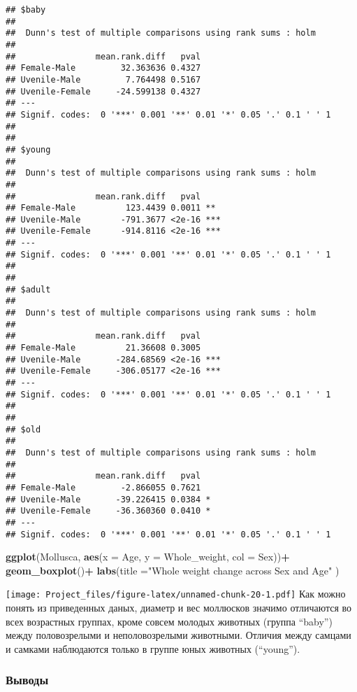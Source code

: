 \documentclass[]{article}
\newenvironment{Shaded}{\begin{snugshade}}{\end{snugshade}}
\newcommand{\DataTypeTok}[1]{\textcolor[rgb]{0.13,0.29,0.53}{#1}}
\newcommand{\KeywordTok}[1]{\textcolor[rgb]{0.13,0.29,0.53}{\textbf{#1}}}
\newcommand{\NormalTok}[1]{#1}
\newcommand{\OperatorTok}[1]{\textcolor[rgb]{0.81,0.36,0.00}{\textbf{#1}}}
\newcommand{\StringTok}[1]{\textcolor[rgb]{0.31,0.60,0.02}{#1}}
\begin{document}
\begin{verbatim}
## $baby
## 
##  Dunn's test of multiple comparisons using rank sums : holm  
## 
##                mean.rank.diff   pval    
## Female-Male         32.363636 0.4327    
## Uvenile-Male         7.764498 0.5167    
## Uvenile-Female     -24.599138 0.4327    
## ---
## Signif. codes:  0 '***' 0.001 '**' 0.01 '*' 0.05 '.' 0.1 ' ' 1
## 
## 
## $young
## 
##  Dunn's test of multiple comparisons using rank sums : holm  
## 
##                mean.rank.diff   pval    
## Female-Male          123.4439 0.0011 ** 
## Uvenile-Male        -791.3677 <2e-16 ***
## Uvenile-Female      -914.8116 <2e-16 ***
## ---
## Signif. codes:  0 '***' 0.001 '**' 0.01 '*' 0.05 '.' 0.1 ' ' 1
## 
## 
## $adult
## 
##  Dunn's test of multiple comparisons using rank sums : holm  
## 
##                mean.rank.diff   pval    
## Female-Male          21.36608 0.3005    
## Uvenile-Male       -284.68569 <2e-16 ***
## Uvenile-Female     -306.05177 <2e-16 ***
## ---
## Signif. codes:  0 '***' 0.001 '**' 0.01 '*' 0.05 '.' 0.1 ' ' 1
## 
## 
## $old
## 
##  Dunn's test of multiple comparisons using rank sums : holm  
## 
##                mean.rank.diff   pval    
## Female-Male         -2.866055 0.7621    
## Uvenile-Male       -39.226415 0.0384 *  
## Uvenile-Female     -36.360360 0.0410 *  
## ---
## Signif. codes:  0 '***' 0.001 '**' 0.01 '*' 0.05 '.' 0.1 ' ' 1
\end{verbatim}

\begin{Shaded}
\begin{Highlighting}[]
\KeywordTok{ggplot}\NormalTok{(Mollusca, }\KeywordTok{aes}\NormalTok{(}\DataTypeTok{x =}\NormalTok{ Age, }\DataTypeTok{y =}\NormalTok{ Whole_weight, }\DataTypeTok{col =}\NormalTok{ Sex))}\OperatorTok{+}
\StringTok{   }\KeywordTok{geom_boxplot}\NormalTok{()}\OperatorTok{+}
\StringTok{   }\KeywordTok{labs}\NormalTok{(}\DataTypeTok{title =}\StringTok{"Whole weight change across Sex and Age"}\NormalTok{ )}
\end{Highlighting}
\end{Shaded}

\texttt{[image: Project\_files/figure-latex/unnamed-chunk-20-1.pdf]} Как
можно понять из приведенных даных, диаметр и вес моллюсков значимо
отличаются во всех возрастных группах, кроме совсем молодых животных
(группа ``baby'') между половозрелыми и неполовозрелыми животными.
Отличия между самцами и самками наблюдаются только в группе юных
животных (``young'').

\hypertarget{ux432ux44bux432ux43eux434ux44b}{%
\subsubsection{Выводы}\label{ux432ux44bux432ux43eux434ux44b}}
\end{document}
